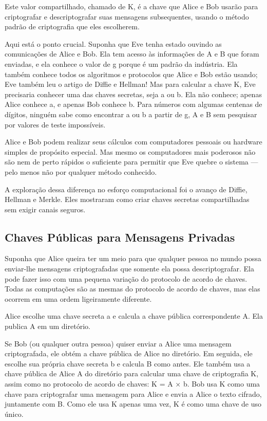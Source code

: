 \documentclass{book}
\begin{document}
Este valor compartilhado, chamado de K, é a chave que Alice e Bob usarão para criptografar e descriptografar suas mensagens subsequentes, usando o método padrão de criptografia que eles escolherem.

Aqui está o ponto crucial. Suponha que Eve tenha estado ouvindo as comunicações de Alice e Bob. Ela tem acesso às informações de A e B que foram enviadas, e ela conhece o valor de g porque é um padrão da indústria. Ela também conhece todos os algoritmos e protocolos que Alice e Bob estão usando; Eve também leu o artigo de Diffie e Hellman! Mas para calcular a chave K, Eve precisaria conhecer uma das chaves secretas, seja a ou b. Ela não conhece; apenas Alice conhece a, e apenas Bob conhece b. Para números com algumas centenas de dígitos, ninguém sabe como encontrar a ou b a partir de g, A e B sem pesquisar por valores de teste impossíveis.

Alice e Bob podem realizar seus cálculos com computadores pessoais ou hardware simples de propósito especial. Mas mesmo os computadores mais poderosos não são nem de perto rápidos o suficiente para permitir que Eve quebre o sistema --- pelo menos não por qualquer método conhecido.

A exploração dessa diferença no esforço computacional foi o avanço de Diffie, Hellman e Merkle. Eles mostraram como criar chaves secretas compartilhadas sem exigir canais seguros.


\subsection{Chaves Públicas para Mensagens Privadas}
\label{segredos:chaves-pub-mens-priv}

Suponha que Alice queira ter um meio para que qualquer pessoa no mundo possa enviar-lhe mensagens criptografadas que somente ela possa descriptografar. Ela pode fazer isso com uma pequena variação do protocolo de acordo de chaves. Todas as computações são as mesmas do protocolo de acordo de chaves, mas elas ocorrem em uma ordem ligeiramente diferente.

Alice escolhe uma chave secreta a e calcula a chave pública correspondente A. Ela publica A em um diretório.

Se Bob (ou qualquer outra pessoa) quiser enviar a Alice uma mensagem criptografada, ele obtém a chave pública de Alice no diretório. Em seguida, ele escolhe sua própria chave secreta b e calcula B como antes. Ele também usa a chave pública de Alice A do diretório para calcular uma chave de criptografia K, assim como no protocolo de acordo de chaves: K = A × b. Bob usa K como uma chave para criptografar uma mensagem para Alice e envia a Alice o texto cifrado, juntamente com B. Como ele usa K apenas uma vez, K é como uma chave de uso único.
\end{document}
